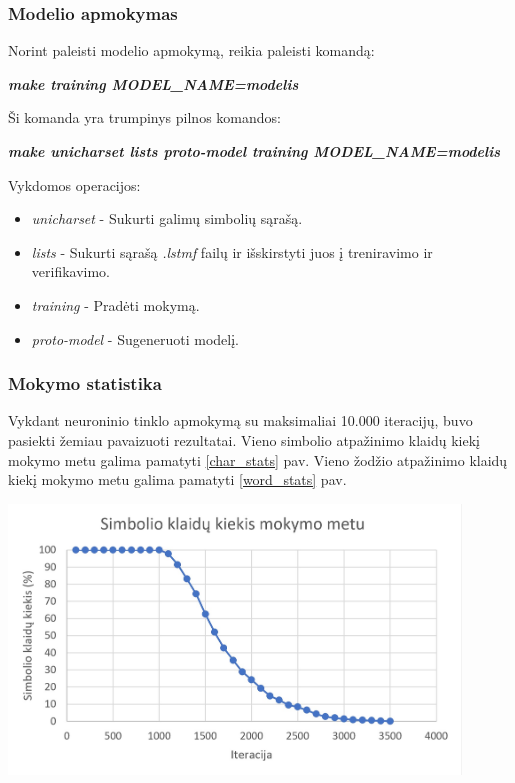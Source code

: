 \documentclass{VUMIFInfBakalaurinis}
\begin{document}
\subsubsection{Modelio apmokymas}

Norint paleisti modelio apmokymą, reikia paleisti komandą: 

\textbf{\textit{make training MODEL\_NAME=modelis}}

Ši komanda yra trumpinys pilnos komandos:

\textbf{\textit{make unicharset lists proto-model training MODEL\_NAME=modelis}}

Vykdomos operacijos:
\begin{itemize}[itemsep=0.5pt]
  \item \textit{unicharset} - Sukurti galimų simbolių sąrašą.
  \item \textit{lists} - Sukurti sąrašą \textit{.lstmf} failų ir išskirstyti juos į treniravimo ir verifikavimo.
  \item \textit{training} - Pradėti mokymą.
  \item \textit{proto-model} - Sugeneruoti modelį.
\end{itemize}

\subsubsection{Mokymo statistika}
Vykdant neuroninio tinklo apmokymą su maksimaliai 10.000 iteracijų, buvo pasiekti žemiau pavaizuoti rezultatai.
Vieno simbolio atpažinimo klaidų kiekį mokymo metu galima pamatyti \ref{char_stats} pav.
Vieno žodžio atpažinimo klaidų kiekį mokymo metu galima pamatyti \ref{word_stats} pav.

\begin{minipage}{\linewidth}
  \centering
  \includegraphics[width=12cm]{char_stats.jpg}
  \label{char_stats}
\end{minipage}
\end{document}
